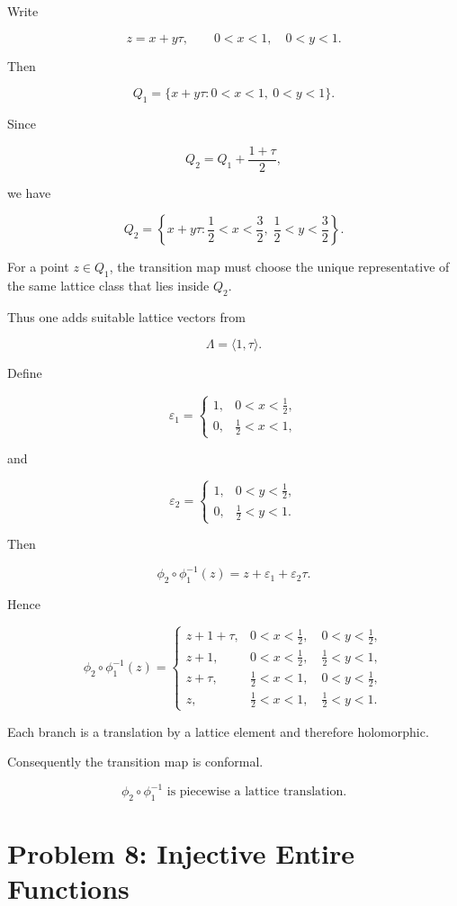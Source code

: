 \documentclass[12pt,a4paper]{article}
\theoremstyle{notespace}
\begin{document}
Write

\[
z=x+y\tau,
\qquad
0<x<1,\quad 0<y<1.
\]

Then

\[
Q_1
=
\{x+y\tau:0<x<1,\ 0<y<1\}.
\]

Since

\[
Q_2
=
Q_1+\frac{1+\tau}{2},
\]

we have

\[
Q_2
=
\left\{
x+y\tau:
\frac12<x<\frac32,
\;
\frac12<y<\frac32
\right\}.
\]

For a point \(z\in Q_1\), the transition map must choose the unique representative of the same lattice class that lies inside \(Q_2\).

Thus one adds suitable lattice vectors from

\[
\Lambda=\langle 1,\tau\rangle.
\]

Define

\[
\varepsilon_1=
\begin{cases}
	1,&0<x<\frac12,\\[1ex]
	0,&\frac12<x<1,
\end{cases}
\]

and

\[
\varepsilon_2=
\begin{cases}
	1,&0<y<\frac12,\\[1ex]
	0,&\frac12<y<1.
\end{cases}
\]

Then

\[
\phi_2\circ\phi_1^{-1}(z)
=
z+\varepsilon_1+\varepsilon_2\tau.
\]

Hence

\[
\phi_2\circ\phi_1^{-1}(z)
=
\begin{cases}
	z+1+\tau,
	&
	0<x<\frac12,\quad 0<y<\frac12,
	\\[2ex]
	z+1,
	&
	0<x<\frac12,\quad \frac12<y<1,
	\\[2ex]
	z+\tau,
	&
	\frac12<x<1,\quad 0<y<\frac12,
	\\[2ex]
	z,
	&
	\frac12<x<1,\quad \frac12<y<1.
\end{cases}
\]

Each branch is a translation by a lattice element and therefore holomorphic.

Consequently the transition map is conformal.

\[
\boxed{
	\phi_2\circ\phi_1^{-1}
	\text{ is piecewise a lattice translation.}
}
\]

\bigskip

\section{Problem 8: Injective Entire Functions}
\end{document}
